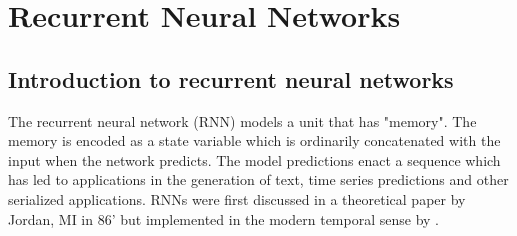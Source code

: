 
\section{Recurrent Neural Networks}\label{sec:rnn}

\subsection{Introduction to recurrent neural networks}

The recurrent neural network (RNN) models a unit that has "memory". The memory is encoded as a state variable which is ordinarily concatenated with the input when the network predicts. The model predictions enact a sequence which has led to applications in the generation of text, time series predictions and other serialized applications. RNNs were first discussed in a theoretical paper by Jordan, MI in 86' but implemented in the modern temporal sense by \citet{Pearlmutter1989}. 


\begin{figure}[h]
\centering
\end{figure}
